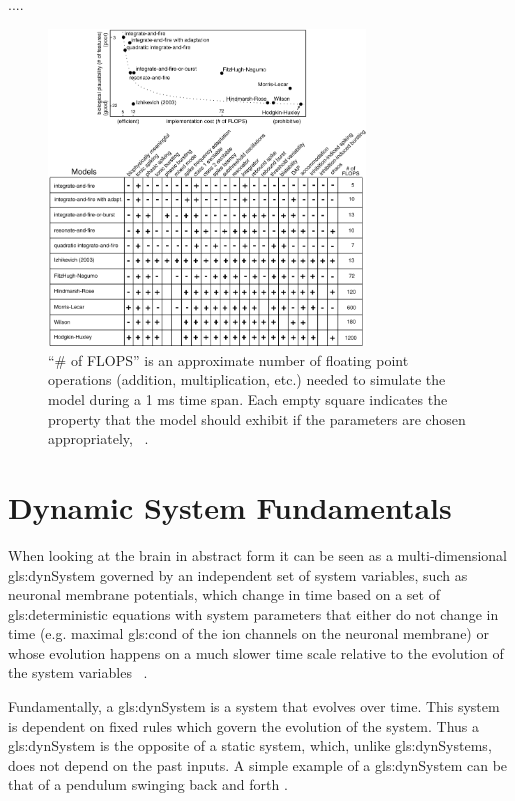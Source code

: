 \documentclass[class={.NoTouch/myProject}, crop=false]{standalone}
\begin{document}
....


\begin{figure}[H]
    \centering
    \includegraphics[width = 0.75\textwidth]{Pictures/Kenni/properties_spiking_bursting_models_all.png}
    \caption{“\# of FLOPS” is an approximate number of floating point operations (addition, multiplication, etc.) needed to simulate the model during a 1 ms time span. Each empty square indicates the property that the model should exhibit if the parameters are chosen appropriately, ~\cite{izhikevich2004model}.}
    \label{fig:computational_properties}
\end{figure}






\section{Dynamic System Fundamentals}
When looking at the brain in abstract form it can be seen as a multi-dimensional \gls{gls:dynSystem} governed by an independent set of system variables, such as neuronal membrane potentials, which change in time based on a set of \gls{gls:deterministic} equations with system parameters that either do not change in time (e.g. maximal \gls{gls:cond} of the ion
channels on the neuronal membrane) or whose evolution happens on a much slower time scale relative to the evolution of the system variables ~\cite{STEFANESCU2012748}.


Fundamentally, a \gls{gls:dynSystem} is a system that evolves over time. This system is dependent on fixed rules which govern the evolution of the system. Thus a \gls{gls:dynSystem} is the opposite of a static system, which, unlike \gls{gls:dynSystem}s, does not depend on the past inputs. A simple example of a \gls{gls:dynSystem} can be that of a pendulum swinging back and forth \cite{}. 
\end{document}
